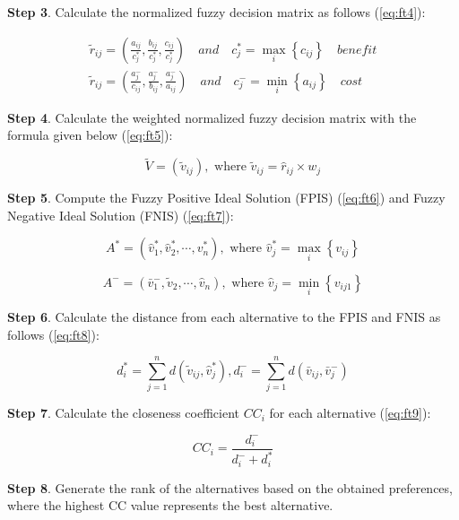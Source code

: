 \noindent \textbf{Step 3}. Calculate the normalized fuzzy decision matrix as follows (\ref{eq:ft4}):

\begin{equation}
\begin{array}{l}
\tilde{r}_{i j}=\left(\frac{a_{i j}}{c_{j}^{*}}, \frac{b_{i j}}{c_{j}^{*}}, \frac{c_{i j}}{c_{j}^{*}}\right) \quad and \quad c_{j}^{*}=\max _{i}\left\{c_{i j}\right\} \quad benefit \\
\tilde{r}_{i j}=\left(\frac{a_{j}^{-}}{c_{i j}}, \frac{a_{j}^{-}}{b_{i j}}, \frac{a_{j}^{-}}{a_{i j}}\right) \quad and  \quad c_{j}^{-}=\min _{i}\left\{a_{i j}\right\} \quad cost
\end{array}
\label{eq:ft4}
\end{equation}

\noindent \textbf{Step 4}. Calculate the weighted normalized fuzzy decision matrix with the formula given below (\ref{eq:ft5}):

\begin{equation}
    \tilde{V}=\left(\tilde{v}_{i j}\right), \text { where } \tilde{v}_{i j}=\hat{r}_{i j} \times w_{j}
\label{eq:ft5}
\end{equation}

\noindent \textbf{Step 5}. Compute the Fuzzy Positive Ideal Solution (FPIS) (\ref{eq:ft6}) and Fuzzy Negative Ideal Solution (FNIS) (\ref{eq:ft7}):

\begin{equation}
A^{*}=\left(\hat{v}_{1}^{*}, \hat{v}_{2}^{*}, \cdots, v_{n}^{*}\right), \text { where } \hat{v}_{j}^{*}=\max _{i}\left\{v_{i j}\right\}
\label{eq:ft6}
\end{equation}

\begin{equation}
A^{-}=\left(\bar{v}_{1}^{-}, \tilde{v}_{2}, \cdots, \hat{v}_{n}\right), \text { where } \hat{v}_{j}=\min _{i}\left\{v_{i j 1}\right\}
\label{eq:ft7}
\end{equation}

\noindent \textbf{Step 6}. Calculate the distance from each alternative to the FPIS and FNIS as follows (\ref{eq:ft8}):

\begin{equation}
d_{i}^{*}=\sum_{j=1}^{n} d\left(\tilde{v}_{i j}, \hat{v}_{j}^{*}\right), d_{i}^{-}=\sum_{j=1}^{n} d\left(\bar{v}_{i j}, \bar{v}_{j}^{-}\right)
\label{eq:ft8}
\end{equation}

\noindent \textbf{Step 7}. Calculate the closeness coefficient $CC_{i}$ for each alternative (\ref{eq:ft9}):

\begin{equation}
C C_{i}=\frac{d_{i}^{-}}{d_{i}^{-}+d_{i}^{*}}
\label{eq:ft9}
\end{equation}

\noindent \textbf{Step 8}. Generate the rank of the alternatives based on the obtained preferences, where the highest CC value represents the best alternative.
